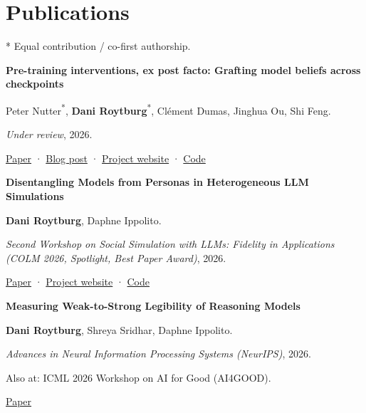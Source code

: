\documentclass[10pt,letterpaper]{article}
\begin{document}
\section*{Publications}
{\small\sffamily\color{muted}* Equal contribution / co-first authorship.}\par
\vspace{5pt}{\sffamily\bfseries Under review}\par
{}\textbf{Pre-training interventions, ex post facto: Grafting model beliefs across checkpoints}\par
Peter Nutter\textsuperscript{*}, \textbf{Dani Roytburg}\textsuperscript{*}, Clément Dumas, Jinghua Ou, Shi Feng.\par
\textit{Under review}, 2026.\par
{\small\sffamily \href{https://arxiv.org/abs/2610.00767}{Paper} · \href{https://www.lesswrong.com/posts/NvtLJ5nawJ6akWEqH/you-can-graft-sdf-changes-from-base-models-onto-post-trained}{Blog post} · \href{https://praxis-research.org/grafting}{Project website} · \href{https://github.com/peternutter/grafting-beliefs}{Code}}\par\vspace{3pt}
\vspace{5pt}{\sffamily\bfseries Conference \& workshop papers}\par
{}\textbf{Disentangling Models from Personas in Heterogeneous LLM Simulations}\par
\textbf{Dani Roytburg}, Daphne Ippolito.\par
\textit{Second Workshop on Social Simulation with LLMs: Fidelity in Applications (COLM 2026, Spotlight, Best Paper Award)}, 2026.\par
{\small\sffamily \href{https://openreview.net/forum?id=ZBC0tbXyhg}{Paper} · \href{https://djroytburg.github.io/divsim/}{Project website} · \href{https://github.com/djroytburg/divsim_publish}{Code}}\par\vspace{3pt}
\textbf{Measuring Weak-to-Strong Legibility of Reasoning Models}\par
\textbf{Dani Roytburg}, Shreya Sridhar, Daphne Ippolito.\par
\textit{Advances in Neural Information Processing Systems (NeurIPS)}, 2026.\par
{\footnotesize\color{muted}Also at: ICML 2026 Workshop on AI for Good (AI4GOOD).}\par
{\small\sffamily \href{https://openreview.net/forum?id=IR4nD1PK12#discussion}{Paper}}\par\vspace{3pt}
\end{document}
